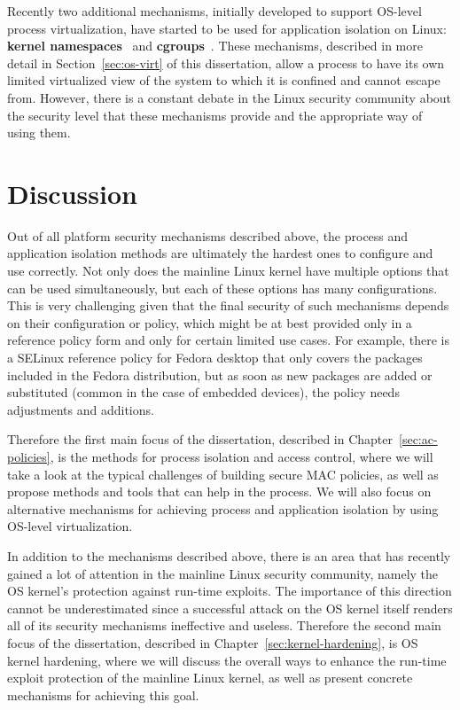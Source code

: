 Recently two additional mechanisms, initially developed to support OS-level process virtualization, have started to be used for application isolation on Linux: \textbf{kernel namespaces}~\cite{biederman2006} and \textbf{cgroups}~\cite{cgroupsv2}. These mechanisms, described in more detail in Section~\ref{sec:os-virt} of this dissertation, allow a process to have its own limited virtualized view of the system to which it is confined and cannot escape from. However, there is a constant debate in the Linux security community about the security level that these mechanisms provide and the appropriate way of using them.   

\section{Discussion}

Out of all platform security mechanisms described above, the process and application isolation methods are ultimately the hardest ones to configure and use correctly. Not only does the mainline Linux kernel have multiple options that can be used simultaneously, but each of these options has many configurations. This is very challenging given that the final security of such mechanisms depends on their configuration or policy, which might be at best provided only in a reference policy form and only for certain limited use cases. For example, there is a SELinux reference policy for Fedora desktop that only covers the packages included in the Fedora distribution, but as soon as new packages are added or substituted (common in the case of embedded devices), the policy needs adjustments and additions. 

Therefore the first main focus of the dissertation, described in Chapter~\ref{sec:ac-policies}, is the methods for process isolation and access control, where we will take a look at the typical challenges of building secure MAC policies, as well as propose methods and tools that can help in the process. We will also focus on alternative mechanisms for achieving process and application isolation by using OS-level virtualization. 

In addition to the mechanisms described above, there is an area that has recently gained a lot of attention in the mainline Linux security community, namely the OS kernel's protection against run-time exploits. The importance of this direction cannot be underestimated since a successful attack on the OS kernel itself renders all of its security mechanisms ineffective and useless. Therefore the second main focus of the dissertation, described in Chapter~\ref{sec:kernel-hardening}, is OS kernel hardening, where we will discuss the overall ways to enhance the run-time exploit protection of the mainline Linux kernel, as well as present concrete mechanisms for achieving this goal. 
 